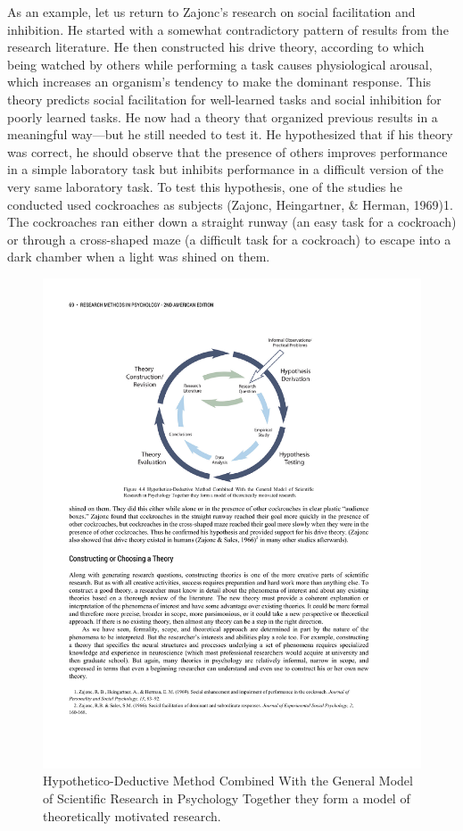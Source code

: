 As an example, let us return to Zajonc's research on social facilitation and inhibition. He started with a somewhat contradictory pattern of results from the research literature. He then constructed his drive theory, according to which being watched by others while performing a task causes physiological arousal, which increases an organism's tendency to make the dominant response. This theory predicts social facilitation for well-learned tasks and social inhibition for poorly learned tasks. He now had a theory that organized previous results in a meaningful way---but he still needed to test it. He hypothesized that if his theory was correct, he should observe that the presence of others improves performance in a simple laboratory task but inhibits performance in a difficult version of the very same laboratory task. To test this hypothesis, one of the studies he conducted used cockroaches as subjects (Zajonc, Heingartner, \& Herman, 1969)1. The cockroaches ran either down a straight runway (an easy task for a cockroach) or through a cross-shaped maze (a difficult task for a cockroach) to escape into a dark chamber when a light was
shined on them. 


\begin{figure}
 
      \includegraphics[width=\linewidth]{figures/C4Theory.pdf}
 
      \caption{Hypothetico-Deductive Method Combined With the General Model of Scientific Research in Psychology Together they form a model of theoretically motivated research.
}
 
      \label{fig:Theory}
 
\end{figure}

